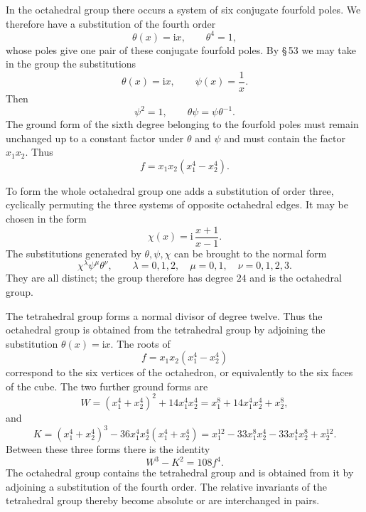 \documentclass[11pt]{article}
\providecommand{\ii}{\mathrm{i}}
\begin{document}
In the octahedral group there occurs a system of six conjugate fourfold poles. We therefore have a substitution of the fourth order
\[
 \theta(x)=\ii x,\qquad \theta^4=1,
\]
whose poles give one pair of these conjugate fourfold poles. By \S\,53 we may take in the group the substitutions
\begin{equation}
 \theta(x)=\ii x,\qquad \psi(x)=\frac1x .
\tag{1}
\end{equation}
Then
\begin{equation}
 \psi^2=1,\qquad \theta\psi=\psi\theta^{-1}.
\tag{2}
\end{equation}
The ground form of the sixth degree belonging to the fourfold poles must remain unchanged up to a constant factor under $\theta$ and $\psi$ and must contain the factor $x_1x_2$. Thus
\begin{equation}
 f=x_1x_2(x_1^4-x_2^4).
\tag{3}
\end{equation}

To form the whole octahedral group one adds a substitution of order three, cyclically permuting the three systems of opposite octahedral edges. It may be chosen in the form
\begin{equation}
 \chi(x)=\ii\,\frac{x+1}{x-1}.
\tag{4}
\end{equation}
The substitutions generated by $\theta,\psi,\chi$ can be brought to the normal form
\begin{equation}
 \chi^\lambda\psi^\mu\theta^\nu,\qquad
 \lambda=0,1,2,\quad \mu=0,1,\quad \nu=0,1,2,3.
\tag{5}
\end{equation}
They are all distinct; the group therefore has degree $24$ and is the octahedral group.

The tetrahedral group forms a normal divisor of degree twelve. Thus the octahedral group is obtained from the tetrahedral group by adjoining the substitution $\theta(x)=\ii x$. The roots of
\[
 f=x_1x_2(x_1^4-x_2^4)
\]
correspond to the six vertices of the octahedron, or equivalently to the six faces of the cube. The two further ground forms are
\begin{equation}
 W=(x_1^4+x_2^4)^2+14x_1^4x_2^4
   =x_1^8+14x_1^4x_2^4+x_2^8,
\tag{6}
\end{equation}
and
\begin{equation}
 K=(x_1^4+x_2^4)^3-36x_1^4x_2^4(x_1^4+x_2^4)
   =x_1^{12}-33x_1^8x_2^4-33x_1^4x_2^8+x_2^{12}.
\tag{7}
\end{equation}
Between these three forms there is the identity
\begin{equation}
 W^3-K^2=108 f^4 .
\tag{8}
\end{equation}
The octahedral group contains the tetrahedral group and is obtained from it by adjoining a substitution of the fourth order. The relative invariants of the tetrahedral group thereby become absolute or are interchanged in pairs.
\end{document}
